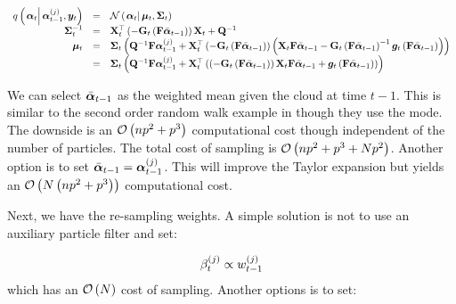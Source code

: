 \begin{equation}\label{eqn:TaylorProposalForward}\begin{array}{rcl}
	\IDC{\vec{\alpha}_t}{\partic{\vec{\alpha}}{t-1}{j}, \vec{y}_t} &=&  %
		\normalC{\vec{\alpha}_t}{\vec{\mu}_t}{\mat{\Sigma}_t} \\
%
	\mat{\Sigma}_t^{-1} &=& \mat{X}_t^\top 
		\Lparen{-\mat{G}_t\Lparen{\mat{F}\vecb{\alpha}_{t - 1}}}
		\mat{X}_t + \mat{Q}^{-1}  \\
%
	\vec{\mu}_t &=& \mat{\Sigma}_t\Lparen{
		\mat{Q}^{-1}\mat{F}\partic{\vec{\alpha}}{t-1}{j} + 
		\mat{X}_t^\top \Lparen{-\mat{G}_t\Lparen{\mat{F}\vecb{\alpha}_{t - 1}}}
		\Lparen{
			\mat{X}_t\mat{F}\vecb{\alpha}_{t - 1} - 
			\mat{G}_t\Lparen{\mat{F}\vecb{\alpha}_{t - 1}}^{-1}
			\vec{g}_t\Lparen{\mat{F}\vecb{\alpha}_{t - 1}}
		}
	} \\
%
	 &=& \mat{\Sigma}_t\Lparen{
		\mat{Q}^{-1}\mat{F}\partic{\vec{\alpha}}{t-1}{j} + 
		\mat{X}_t^\top
		\Lparen{
			\Lparen{-\mat{G}_t\Lparen{\mat{F}\vecb{\alpha}_{t - 1}}}
			\mat{X}_t\mat{F}\vecb{\alpha}_{t - 1} +
			\vec{g}_t\Lparen{\mat{F}\vecb{\alpha}_{t - 1}}
		}
	}
\end{array}\end{equation}
%
%

We can select  $\bar{\bm{\alpha}}_{t - 1}$ as the weighted mean given the cloud at time $t-1$. This is similar to the second order random walk example in \cite{fearnhead10} though they use the mode. The downside is an $\mathcal{O}\left( np^2+p^3\right)$ computational cost though independent of the number of particles. The total cost of sampling is $\mathcal{O}\left( np^2+p^3 + Np^2\right)$. Another option is to set $\bar{\bm{\alpha}}_{t - 1} = \bm{\alpha}_{t-1}^{\left( j\right)}$. This will improve the Taylor expansion but yields an $\mathcal{O}\left( N\left( np^2+p^3\right)\right)$ computational cost. 

Next, we have the re-sampling weights. A simple solution is not to use an auxiliary particle filter and set:

\begin{equation}
	\beta_{t}^{\left( j\right)} \propto w_{t-1}^{\left( j\right)}
\end{equation}
%
which has an $\mathcal{O}\left( N\right)$ cost of sampling. Another options is to set:

